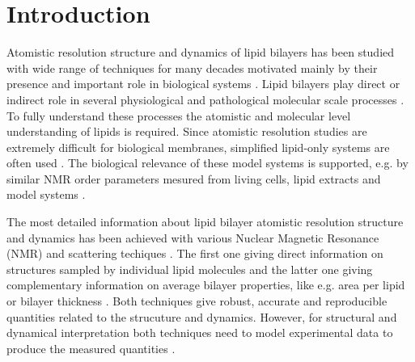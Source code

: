 \documentclass[aps,prl,superscriptaddress,twocolumn]{revtex4}
\begin{document}

\maketitle %



\section{Introduction}
Atomistic resolution structure and dynamics of lipid bilayers has been studied
with wide range of techniques for many decades motivated mainly
by their presence and important role in biological systems \cite{israelachvili80,jacobs81,davis83,bloom91,nagle00,??}.
Lipid bilayers play direct or indirect role in several physiological and pathological
molecular scale processes \cite{lee04,kinnunen09,??}. To fully understand these processes the atomistic and
molecular level understanding of lipids is required. Since atomistic resolution studies are
extremely difficult for biological membranes, simplified lipid-only systems are often used \cite{??}.
The biological relevance of these model systems is supported, e.g. by similar NMR order parameters 
mesured from living cells, lipid extracts and model systems \cite{??}. 

The most detailed information about lipid bilayer atomistic resolution structure and dynamics has been
achieved with various Nuclear Magnetic Resonance (NMR) and scattering techiques \cite{jacobs81,davis83,bloom91,nagle00,pabst.10,kucerka.11,marquardt15}. 
The first one giving direct information on structures sampled by individual lipid molecules \cite{jacobs81,davis83,bloom91,??} and
the latter one giving complementary information on average bilayer properties, like e.g. area per lipid or bilayer thickness \cite{nagle00,pabst.10,kucerka.11,marquardt15}.
Both techniques give robust, accurate and reproducible quantities related to the strucuture and dynamics.
However, for structural and dynamical interpretation both techniques need to model experimental data to produce 
the measured quantities \cite{jacobs81,davis83,bloom91,nagle00,pabst.10,kucerka.11,marquardt15}. 
\end{document}
